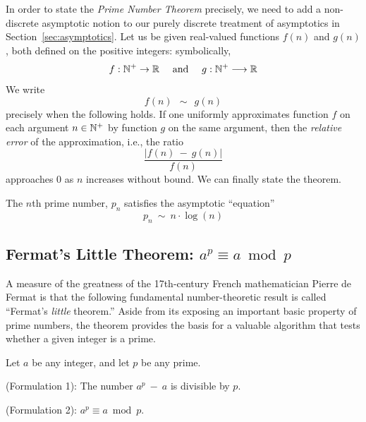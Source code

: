 \smallskip

In order to state the {\it Prime Number Theorem} precisely, we need to add a non-discrete asymptotic notion to our purely discrete treatment of asymptotics in Section~\ref{sec:asymptotics}.  Let us be given real-valued functions $f(n)$ and $g(n)$, both defined on the positive integers: symbolically,
\[
f: \mathbb{N}^+ \rightarrow  \mathbb{R} \ \ \ \mbox{ and } \ \ \
g: \mathbb{N}^+ \longrightarrow  \mathbb{R}
\]
We write
\[ f(n) \ \ \sim \ \ g(n) \]
precisely when the following holds.  If one uniformly approximates function $f$ on each argument $n \in \mathbb{N}^+$ by function $g$ on the same argument, then the {\it relative error} of the approximation, i.e., the ratio
\[ \frac{|f(n) \ - \ g(n)|}{f(n)} \]
approaches $0$ as $n$ increases without bound.  We can finally state the theorem.
\index{approximation, relative error}

\begin{theorem}
\label{thm:prime-number-theorem}
The $n$th prime number, $p_n$ satisfies the asymptotic ``equation'' 
\[ p_{n} \  \sim  \ n \cdot \log(n) \]
\end{theorem}
  

\subsection{Fermat's Little Theorem: $a^{p} \equiv a \bmod p$}
\label{sec:fermat}

A measure of the greatness of the 17th-century French mathematician Pierre de Fermat is that the following fundamental number-theoretic result is called ``Fermat's {\em little} theorem.''  Aside from its exposing an important basic property of prime numbers, the theorem provides the basis for a valuable algorithm that tests whether a given integer is a prime.

\begin{theorem}
\label{thm:Fermat's-Little-Thm}
Let $a$ be any integer, and let $p$ be any prime.

{\rm (Formulation 1):}
The number $a^p \ - \ a$ is divisible by $p$.

\medskip

{\rm (Formulation 2):}
$a^{p} \equiv a \bmod p$.
\end{theorem}

%

